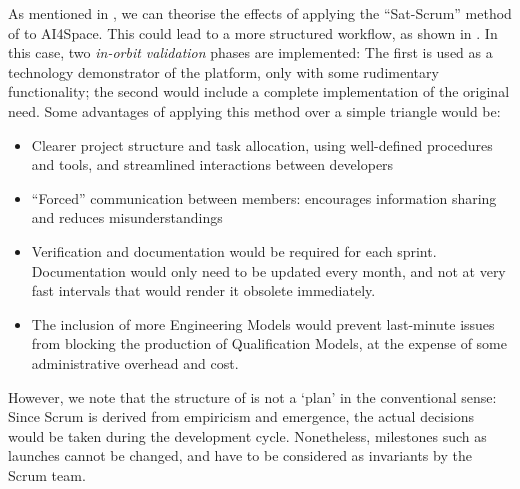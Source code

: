 \documentclass[]{iac}
\def\todo#1{}
\begin{document}
As mentioned in , we can theorise the effects of applying the ``Sat-Scrum'' method of  to AI4Space. This could lead to a more structured workflow, as shown in . In this case, two \emph{in-orbit validation} phases are implemented: The first is used as a technology demonstrator of the platform, only with some rudimentary functionality; the second would include a complete implementation of the original need. Some advantages of applying this method over a simple triangle would be:
\begin{itemize}[itemsep=0pt]
    \item Clearer project structure and task allocation, using well-defined procedures and tools, and streamlined interactions between developers
    \item ``Forced'' communication between members: encourages information sharing and reduces misunderstandings
    \item Verification and documentation would be required for each sprint. Documentation would only need to be updated every month, and not at very fast intervals that would render it obsolete immediately.
    \item The inclusion of more Engineering Models would prevent last-minute issues from blocking the production of Qualification Models, at the expense of some administrative overhead and cost.
\end{itemize}

However, we note that the structure of  is not a `plan' in the conventional sense: Since Scrum is derived from empiricism and emergence, the actual decisions would be taken during the development cycle. Nonetheless, milestones such as launches cannot be changed, and have to be considered as invariants by the Scrum team.

\todo{Estimated manufacturing price?}
			
\end{document}
